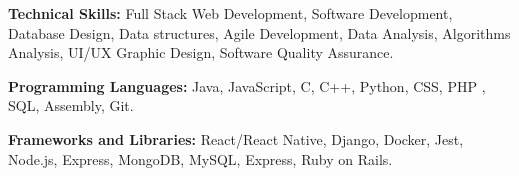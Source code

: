 

\begin{cvparagraph}

\textbf{Technical Skills:}  Full Stack Web Development, Software Development, Database Design, Data structures, Agile Development, Data Analysis, Algorithms Analysis, UI/UX Graphic Design, Software Quality Assurance.

\textbf{Programming Languages:}  Java, JavaScript, C, C++, Python, CSS, PHP , SQL, Assembly, Git.

\textbf{Frameworks and Libraries:}  React/React Native, Django, Docker, Jest, Node.js, Express, MongoDB, MySQL, Express, Ruby on Rails.
\end{cvparagraph}
\vspace{-3ex}

